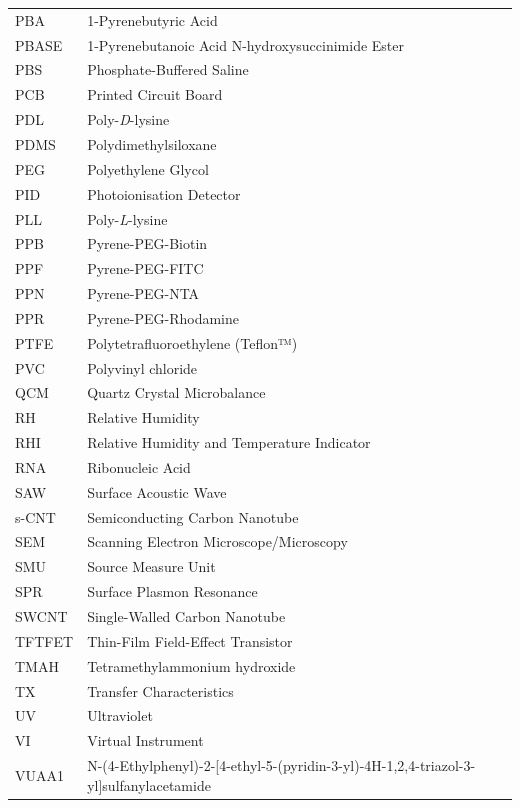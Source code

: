 \documentclass[
  a4paper,
]{scrbook}
\begin{document}
\newpage
\fancyhf{} %
\thispagestyle{fancy} %
\renewcommand{\headrulewidth}{0pt}
\fancyfoot[R]{\thepage} %
\begin{table}[H]
  \begin{tabular}{@{}p{} p{}@{}}  %
    PBA  & 1-Pyrenebutyric Acid  \\[5pt]
    PBASE  & 1-Pyrenebutanoic Acid N-hydroxysuccinimide Ester  \\[5pt]
    PBS  & Phosphate-Buffered Saline  \\[5pt]
    PCB  & Printed Circuit Board   \\[5pt]
    PDL & Poly-\textit{D}-lysine  \\[5pt]
    PDMS  & Polydimethylsiloxane   \\  [5pt]
    PEG  & Polyethylene Glycol  \\[5pt] 
    PID  & Photoionisation Detector  \\[5pt] 
    PLL  & Poly-\textit{L}-lysine  \\[5pt]
    PPB  & Pyrene-PEG-Biotin  \\[5pt]
    PPF  & Pyrene-PEG-FITC  \\[5pt]
    PPN  & Pyrene-PEG-NTA  \\[5pt]
    PPR  & Pyrene-PEG-Rhodamine  \\[5pt]
    PTFE  & Polytetrafluoroethylene (Teflon™)  \\[5pt]
    PVC  & Polyvinyl chloride  \\[5pt]
    QCM  & Quartz Crystal Microbalance  \\[5pt]
    RH  & Relative Humidity  \\[5pt]
    RHI  & Relative Humidity and Temperature Indicator  \\[5pt] 
    RNA  & Ribonucleic Acid   \\[5pt]
    SAW  & Surface Acoustic Wave   \\[5pt]
    s-CNT  & Semiconducting Carbon Nanotube   \\[5pt]
    SEM  & Scanning Electron Microscope/Microscopy   \\[5pt]
    SMU  & Source Measure Unit   \\[5pt]
    SPR  & Surface Plasmon Resonance   \\[5pt]
    SWCNT  & Single-Walled Carbon Nanotube   \\[5pt]
    TFTFET  & Thin-Film Field-Effect Transistor  \\[5pt]
    TMAH  & Tetramethylammonium hydroxide  \\[5pt]
    TX  & Transfer Characteristics  \\[5pt]
    UV  & Ultraviolet  \\[5pt]
    VI  & Virtual Instrument  \\[5pt]
    VUAA1  & N-(4-Ethylphenyl)-2-{[4-ethyl-5-(pyridin-3-yl)-4H-1,2,4-triazol-3-yl]sulfanyl}acetamide  \\[5pt] 
  \end{tabular}
\end{table}
\end{document}
